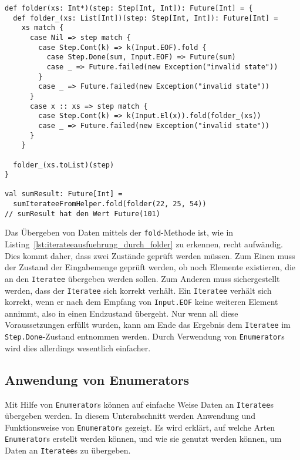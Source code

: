\begin{lstlisting}[caption=Ausführung eines Iteratees durch folder-Funktion, label=lst:iterateeausfuehrung_durch_folder]
def folder(xs: Int*)(step: Step[Int, Int]): Future[Int] = {
  def folder_(xs: List[Int])(step: Step[Int, Int]): Future[Int] =
    xs match {
      case Nil => step match {
        case Step.Cont(k) => k(Input.EOF).fold {
          case Step.Done(sum, Input.EOF) => Future(sum)
          case _ => Future.failed(new Exception("invalid state"))
        }
        case _ => Future.failed(new Exception("invalid state"))
      }
      case x :: xs => step match {
        case Step.Cont(k) => k(Input.El(x)).fold(folder_(xs))
        case _ => Future.failed(new Exception("invalid state"))
      }
    }

  folder_(xs.toList)(step)
}

val sumResult: Future[Int] =
  sumIterateeFromHelper.fold(folder(22, 25, 54))
// sumResult hat den Wert Future(101)
\end{lstlisting}

Das Übergeben von Daten mittels der \lstinline|fold|-Methode ist, wie in Listing~\ref{lst:iterateeausfuehrung_durch_folder} zu erkennen, recht aufwändig.
Dies kommt daher, dass zwei Zustände geprüft werden müssen.
Zum Einen muss der Zustand der Eingabemenge geprüft werden, ob noch Elemente existieren, die an den \lstinline|Iteratee| übergeben werden sollen.
Zum Anderen muss sichergestellt werden, dass der \lstinline|Iteratee| sich korrekt verhält.
Ein \lstinline|Iteratee| verhält sich korrekt, wenn er nach dem Empfang von \lstinline|Input.EOF| keine weiteren Element annimmt, also in einen Endzustand übergeht.
Nur wenn all diese Voraussetzungen erfüllt wurden, kann am Ende das Ergebnis dem \lstinline|Iteratee| im \lstinline|Step.Done|-Zustand entnommen werden.
Durch Verwendung von \lstinline|Enumerator|s wird dies allerdings wesentlich einfacher.



\subsection{Anwendung von Enumerators} %
\label{sub:enumerators}

Mit Hilfe von \lstinline|Enumerator|s können auf einfache Weise Daten an \lstinline|Iteratee|s übergeben werden.
In diesem Unterabschnitt werden Anwendung und Funktionsweise von \lstinline|Enumerator|s gezeigt.
Es wird erklärt, auf welche Arten \lstinline|Enumerator|s erstellt werden können, und wie sie genutzt werden können, um Daten an \lstinline|Iteratee|s zu übergeben.

